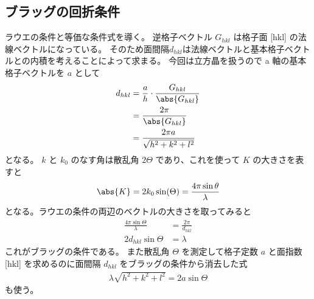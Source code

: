 \documentclass[11pt,dvipdfmx,a4paper]{jsarticle}
\begin{document}
\subsection{ブラッグの回折条件}
ラウエの条件と等価な条件式を導く。
逆格子ベクトル \(G_{hkl}\) は格子面 [hkl] の法線ベクトルになっている。
そのため面間隔\(d_{hkl}\)は法線ベクトルと基本格子ベクトルとの内積を考えることによって求まる。
今回は立方晶を扱うので a 軸の基本格子ベクトルを \(a\) として
\begin{align}
	d_{hkl} &= \frac{a}{h} \cdot \frac{G_{hkl}}{\abs{G_{hkl}}}\\
	&= \frac{2\pi}{\abs{G_{hkl}}} \label{eq:d-G}\\
	&= \frac{2\pi a}{\sqrt{h^2+k^2+l^2}}
\end{align}
となる。
\(k\) と \(k_0\) のなす角は散乱角 \(2\Theta\) であり、これを使って \(K\) の大きさを表すと
\begin{align}
	\abs{K} = 2k_0\sin(\Theta) = \frac{4\pi\sin\theta}{\lambda}
\end{align}
となる。ラウエの条件の両辺のベクトルの大きさを取ってみると
\begin{align}
	\frac{4\pi\sin\Theta}{\lambda} &= \frac{2\pi}{d_{hkl}}\\
	2d_{hkl} \sin\Theta &= \lambda
\end{align}
これがブラッグの条件である。
また散乱角 \(\Theta\) を測定して格子定数 \(a\) と面指数 [hkl] を求めるのに面間隔 \(d_{hkl}\) をブラッグの条件から消去した式
\begin{align}
	\lambda \sqrt{h^2+k^2+l^2}  = 2a \sin\Theta
\end{align}
も使う。
\end{document}
